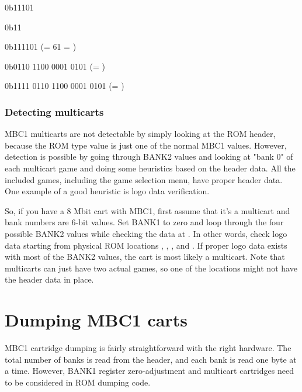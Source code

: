 \begin{description}[leftmargin=15em,style=nextline]
  \item[Value of the BANK1 register]
  {
    \ttfamily
    0b\colorbox{gray!10}{1}\colorbox{blue!30}{1101}
  }
  \item[Value of the BANK2 register]
  {
    \ttfamily
    0b\colorbox{red!30}{11}
  }
  \item[ROM bank number]
  {
    \ttfamily
    0b\colorbox{red!30}{11}\colorbox{blue!30}{1101} (= 61 = )
  }
  \item[Address being read]
  {
    \ttfamily
    0b\colorbox{gray!10}{01}\colorbox{green!30}{10 1100 0001 0101} (= )
  }
  \item[Actual physical ROM address]
  {
    \ttfamily
    0b\colorbox{red!30}{11}\colorbox{blue!30}{11 01}\colorbox{green!30}{10 1100 0001 0101} (= )
  }
\end{description}

\subsubsection{Detecting multicarts}

MBC1 multicarts are not detectable by simply looking at the ROM header, because
the ROM type value is just one of the normal MBC1 values. However, detection is
possible by going through BANK2 values and looking at "bank 0" of each
multicart game and doing some heuristics based on the header data. All the
included games, including the game selection menu, have proper header data.
One example of a good heuristic is logo data verification.

So, if you have a 8 Mbit cart with MBC1, first assume that it's a multicart and
bank numbers are 6-bit values. Set BANK1 to zero and loop through the four
possible BANK2 values while checking the data at . In
other words, check logo data starting from physical ROM locations ,
, , and . If proper logo data exists with most
of the BANK2 values, the cart is most likely a multicart. Note that multicarts
can just have two actual games, so one of the locations might not have the
header data in place.

\section{Dumping MBC1 carts}

MBC1 cartridge dumping is fairly straightforward with the right hardware. The
total number of banks is read from the header, and each bank is read one byte
at a time. However, BANK1 register zero-adjustment and multicart cartridges
need to be considered in ROM dumping code.

